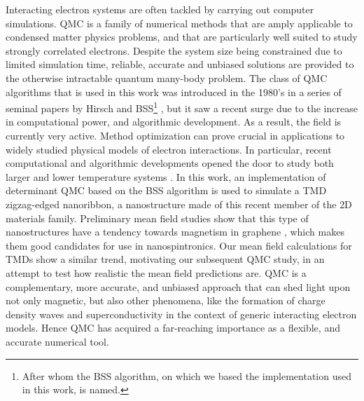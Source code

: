 Interacting electron systems are often tackled by carrying out computer simulations.
\ac{QMC} is a family of numerical methods that are  amply applicable to condensed matter physics problems, and that are particularly well suited to study strongly correlated electrons.
Despite the system size being constrained due to limited simulation time, reliable, accurate and unbiased solutions are provided to the otherwise intractable quantum many-body problem.
The class of \acs{QMC} algorithms that is used in this work was introduced in the 1980's in a series of seminal papers by Hirsch and \acl{BSS}\footnote{After whom the \ac{BSS} algorithm, on which we based the implementation used in this work, is named.} \cite{hirsch_discrete_1983, hirsch_monte_1982, blankenbecler_monte_1981, hirsch_two-dimensional_1985, hirsch_monte_1983, hirsch_stable_1988, hirsch_antiferromagnetism_1989}, but it saw a recent surge \cite{dumitrescu_superconductivity_2016, berg_monte_2018, beyl_revisiting_2018, chang_recent_2015, esterlis_breakdown_2018, mondaini_determinant_2012, meng_characterization_2014, kung_characterizing_2016, johnston_determinant_2013, rademaker_determinant_2013, ying_determinant_2014, scalettar_numerical_2007, zhou_quantum_2014} due to the increase in computational power, and algorithmic development.
As a result, the field is currently very active. 
Method optimization can prove crucial in applications to widely studied physical models of electron interactions.
In particular, recent computational and algorithmic developments opened the door to study both larger and lower temperature systems \cite{jiang_fast_2016, lee_parallelization_2010, chang_recent_2015, bai_stable_2011}.
In this work, an implementation of determinant \acs{QMC} based on the \ac{BSS} algorithm is used to simulate a \ac{TMD} zigzag-edged nanoribbon, a nanostructure made of this recent member of the \acs{2D} materials family.
Preliminary mean field studies show that this type of nanostructures have a tendency towards magnetism in graphene \cite{yazyev_emergence_2010}, which makes them good candidates for use in nanospintronics.
Our mean field calculations for \acp{TMD} show a similar trend, motivating our subsequent \acs{QMC} study, in an attempt to test how realistic the mean field predictions are.
\acs{QMC} is a complementary, more accurate, and unbiased approach that can shed light upon not only magnetic, but also  other phenomena, like the formation of charge density waves and superconductivity in the context of generic interacting electron models. Hence \acs{QMC} has acquired a far-reaching importance as a flexible, and accurate numerical tool.